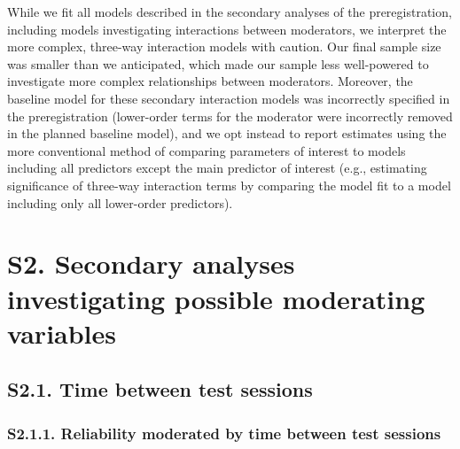 \documentclass[
  man, donotrepeattitle,floatsintext]{apa6}
\begin{document}
\begin{itemize}
  While we fit all models described in the secondary analyses of the preregistration, including models investigating interactions between moderators, we interpret the more complex, three-way interaction models with caution. Our final sample size was smaller than we anticipated, which made our sample less well-powered to investigate more complex relationships between moderators. Moreover, the baseline model for these secondary interaction models was incorrectly specified in the preregistration (lower-order terms for the moderator were incorrectly removed in the planned baseline model), and we opt instead to report estimates using the more conventional method of comparing parameters of interest to models including all predictors except the main predictor of interest (e.g., estimating significance of three-way interaction terms by comparing the model fit to a model including only all lower-order predictors).
\end{itemize}

\newpage

\hypertarget{s2.-secondary-analyses-investigating-possible-moderating-variables}{%
\section{S2. Secondary analyses investigating possible moderating variables}\label{s2.-secondary-analyses-investigating-possible-moderating-variables}}

\hypertarget{s2.1.-time-between-test-sessions}{%
\subsection{S2.1. Time between test sessions}\label{s2.1.-time-between-test-sessions}}

\hypertarget{s2.1.1.-reliability-moderated-by-time-between-test-sessions}{%
\subsubsection{S2.1.1. Reliability moderated by time between test sessions}\label{s2.1.1.-reliability-moderated-by-time-between-test-sessions}}
\end{document}
